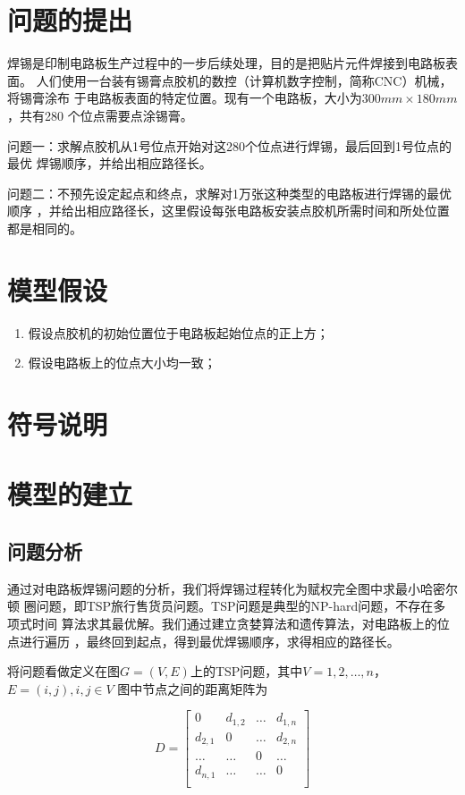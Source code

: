 \documentclass[fontset=windows,a4paper,12pt]{ctexart}
\begin{document}
  \newpage
  \tableofcontents
  \newpage
  \section{问题的提出}
    焊锡是印制电路板生产过程中的一步后续处理，目的是把贴片元件焊接到电路板表面。
    人们使用一台装有锡膏点胶机的数控（计算机数字控制，简称CNC）机械，将锡膏涂布
    于电路板表面的特定位置。现有一个电路板，大小为$300mm\times180mm$，共有280
    个位点需要点涂锡膏。

    问题一：求解点胶机从1号位点开始对这280个位点进行焊锡，最后回到1号位点的最优
    焊锡顺序，并给出相应路径长。

    问题二：不预先设定起点和终点，求解对1万张这种类型的电路板进行焊锡的最优顺序
    ，并给出相应路径长，这里假设每张电路板安装点胶机所需时间和所处位置都是相同的。
  \section{模型假设}
    \begin{enumerate}
      \item 假设点胶机的初始位置位于电路板起始位点的正上方；
      \item 假设电路板上的位点大小均一致；
    \end{enumerate}
  \section{符号说明}
  \section{模型的建立}
    \subsection{问题分析}
      通过对电路板焊锡问题的分析，我们将焊锡过程转化为赋权完全图中求最小哈密尔顿
      圈问题，即TSP旅行售货员问题。TSP问题是典型的NP-hard问题，不存在多项式时间
      算法求其最优解。我们通过建立贪婪算法和遗传算法，对电路板上的位点进行遍历
      ，最终回到起点，得到最优焊锡顺序，求得相应的路径长。
      
      将问题看做定义在图$G=(V,E)$上的TSP问题，其中$V={1,2,\dots,n}$，$E=(i,j),i,j\in V$
      图中节点之间的距离矩阵为
      
      \begin{equation}
      D=\left[
      \begin{array}{cccc}
      	0 & d_{1,2} & \dots & d_{1,n}\\
      	d_{2,1} & 0 & \dots & d_{2,n}\\
      	\dots & \dots & 0 & \dots \\
      	d_{n,1} & \dots & \dots & 0 \\
      \end{array}
      \right]
      \end{equation}
\end{document}
